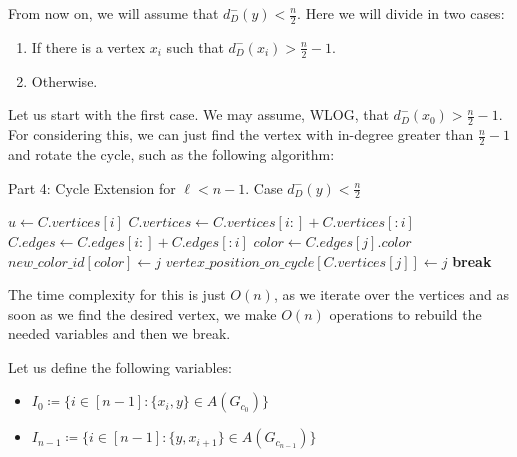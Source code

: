 From now on, we will assume that $d^-_D(y) < \frac{n}{2}$. Here we will divide in two cases:

\begin{enumerate}
    \item If there is a vertex $x_i$ such that $d^-_D(x_i) > \frac{n}{2} - 1$.
    \item Otherwise.
\end{enumerate}

Let us start with the first case. We may assume, WLOG, that $d^-_D(x_0) > \frac{n}{2} - 1$.
For considering this, we can just find the vertex with in-degree greater than $\frac{n}{2} - 1$ and rotate the cycle, such as the following algorithm:

\begin{algorithm}[H]
    \caption{Part 4: Cycle Extension for \( \ell < n - 1 \). Case \( d^-_D(y) < \frac{n}{2} \)}
    \begin{algorithmic}[1]
                \State $u \gets C.vertices[i]$
                    \State $C.vertices \gets C.vertices[i:] + C.vertices[:i]$
                    \State $C.edges \gets C.edges[i:] + C.edges[:i]$
                \EndIf
                    \State $color \gets C.edges[j].color$
                    \State $new\_color\_id[color] \gets j$
                    \State $vertex\_position\_on\_cycle[C.vertices[j]] \gets j$
                \EndFor
                \State \textbf{break}
            \EndFor
        \EndFunction
    \end{algorithmic}
\end{algorithm}

The time complexity for this is just $O(n)$, as we iterate over the vertices and
as soon as we find the desired vertex, we make $O(n)$ operations to rebuild the needed variables and then we break.

Let us define the following variables:

\begin{itemize}
    \item $I_0 \coloneqq \{i \in [n - 1]: \{x_i, y\} \in A(G_{c_0})\}$
    \item $I_{n-1} \coloneqq \{i \in [n - 1]: \{y, x_{i+1}\} \in A(G_{c_{n-1}})\}$
\end{itemize}

